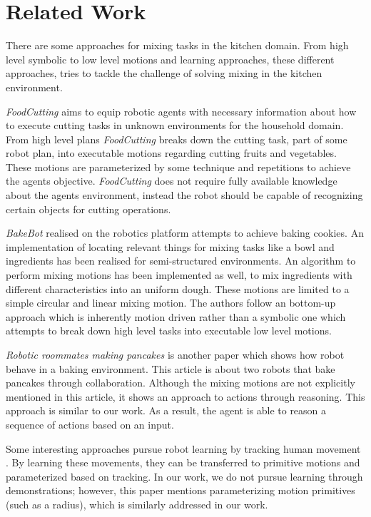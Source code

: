 \chapter{Related Work}
\label{chap:Related_work}
There are some approaches for mixing tasks in the kitchen domain. From high level symbolic to low level motions and 
learning approaches, these different approaches, tries to tackle the challenge of solving mixing in the kitchen environment.

\textit{FoodCutting} \cite{Kuempel2024} aims to equip robotic agents with necessary information about how to 
execute  cutting tasks in unknown environments for the household domain. From high level plans \textit{FoodCutting} \cite{Kuempel2024} breaks down 
the cutting task, part of some robot plan, into executable motions regarding cutting fruits and vegetables. These motions are parameterized 
by some technique and repetitions to achieve the agents objective. 
\textit{FoodCutting} \cite{Kuempel2024} does not require fully available knowledge
about the agents environment, instead the robot should be capable of recognizing certain objects for cutting 
operations. 


\textit{BakeBot} \cite{Bollini2011BakebotBC} realised on the \textit{}  robotics platform attempts to achieve baking cookies. An implementation of locating relevant things for mixing tasks
like a bowl and ingredients has been realised for semi-structured environments. An algorithm to perform mixing motions has been implemented as well, to mix 
ingredients with different characteristics into an uniform dough. These motions are limited to a simple circular and linear mixing motion.
The authors follow an bottom-up approach which is inherently motion driven rather than a
symbolic one which attempts to break down high level tasks into executable low level motions. 

\textit{Robotic roommates making pancakes} \cite{beetzrrmp} is another paper which shows how robot behave in a baking environment. This article is about two robots that bake pancakes through collaboration. 
Although the mixing motions are not explicitly mentioned in this article, it shows an approach to actions through reasoning. This approach is similar to our work. As a result, the agent is able to reason a sequence of actions based on an input.

Some interesting approaches pursue robot learning by tracking human movement \cite{10.1007/978-3-030-95892-3_22}. By learning these movements, they can be transferred to primitive motions and parameterized based on tracking.
In our work, we do not pursue learning through demonstrations; however, this paper mentions parameterizing motion primitives (such as a radius), which is similarly addressed in our work.
 
